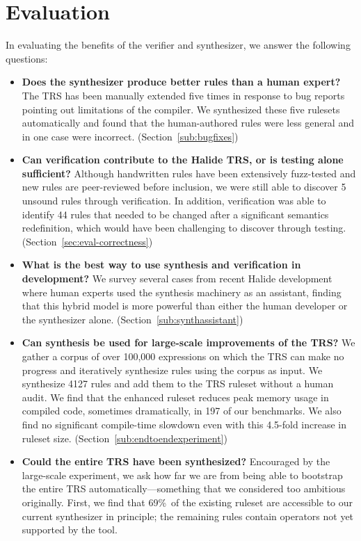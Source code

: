 \documentclass[acmsmall,review]{acmart}\settopmatter{printfolios=true,printccs=false,printacmref=false}
\begin{document}
\section{Evaluation}

\newcommand{\PercentPossibleToSynth}{69\%}
\newcommand{\NumRulesInCorrectnessExperiment}{321}
\newcommand{\PercentRulesResynthesized}{58\%}

In evaluating the benefits of the verifier and synthesizer, we answer the following questions:

\begin{itemize}
  \item \textbf{Does the synthesizer produce better rules than a human expert?} The TRS has been manually extended five times in response to bug reports pointing out limitations of the compiler. We synthesized these five rulesets automatically and found that the human-authored rules were less general and in one case were incorrect. (Section~\ref{sub:bugfixes})
  \item \textbf{Can verification contribute to the Halide TRS, or is testing alone sufficient?} Although handwritten rules have been extensively fuzz-tested and new rules are peer-reviewed before inclusion, we were still able to discover 5 unsound rules through verification. In addition, verification was able to identify 44 rules that needed to be changed after a significant semantics redefinition, which would have been challenging to discover through testing. (Section~\ref{sec:eval-correctness})
  \item \textbf{What is the best way to use synthesis and verification in development?} We survey several cases from recent Halide development where human experts used the synthesis machinery as an assistant, finding that this hybrid model is more powerful than either the human developer or the synthesizer alone. (Section~\ref{sub:synthassistant})
  \item \textbf{Can synthesis be used for large-scale improvements of the TRS?} We gather a corpus of over 100,000 expressions on which the TRS can make no progress and iteratively synthesize rules using the corpus as input. We synthesize 4127 rules and add them to the TRS ruleset without a human audit. We find that the enhanced ruleset reduces peak memory usage in compiled code, sometimes dramatically, in 197 of our benchmarks. We also find no significant compile-time slowdown even with this 4.5-fold increase in ruleset size. (Section~\ref{sub:endtoendexperiment})
  \item \textbf{Could the entire TRS have been synthesized?} Encouraged by the large-scale experiment, we ask how far we are from being able to bootstrap the entire TRS automatically---something that we considered too ambitious originally. First, we find that \PercentPossibleToSynth~of the existing ruleset are accessible to our current synthesizer in principle; the remaining rules contain operators not yet supported by the tool. %

\end{itemize}
\end{document}
